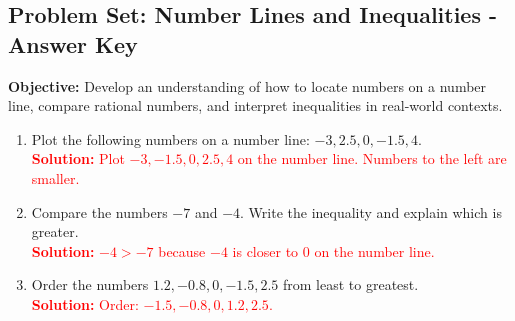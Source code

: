 \documentclass[12pt]{article}
\begin{document}
\subsection*{Problem Set: Number Lines and Inequalities - Answer Key}
\onehalfspacing

\begin{tcolorbox}[colframe=black!40, colback=gray!5, 
coltitle=black, colbacktitle=black!20, fonttitle=\bfseries\Large, 
title=Learning Objective, halign title=center, left=5pt, right=5pt, top=5pt, bottom=5pt]
\textbf{Objective:} \small Develop an understanding of how to locate numbers on a number line, compare rational numbers, and interpret inequalities in real-world contexts.
\end{tcolorbox}

\begin{tcolorbox}[colframe=black!60, colback=white, 
coltitle=black, colbacktitle=black!15, fonttitle=\bfseries\Large, 
title=Exercises, halign title=center, left=10pt, right=10pt, top=10pt, bottom=20pt]
\begin{enumerate}[itemsep=1.5em]
    \item Plot the following numbers on a number line: \( -3, 2.5, 0, -1.5, 4 \).\\
    \textcolor{red}{\textbf{Solution:} Plot \( -3, -1.5, 0, 2.5, 4 \) on the number line. Numbers to the left are smaller.}
    \begin{center}
    \end{center}
    
    \item Compare the numbers \( -7 \) and \( -4 \). Write the inequality and explain which is greater.\\
    \textcolor{red}{\textbf{Solution:} \( -4 > -7 \) because \( -4 \) is closer to \( 0 \) on the number line.}

    \item Order the numbers \( 1.2, -0.8, 0, -1.5, 2.5 \) from least to greatest.\\
    \textcolor{red}{\textbf{Solution:} Order: \( -1.5, -0.8, 0, 1.2, 2.5 \).}


\end{enumerate}
\end{tcolorbox}
\end{document}

